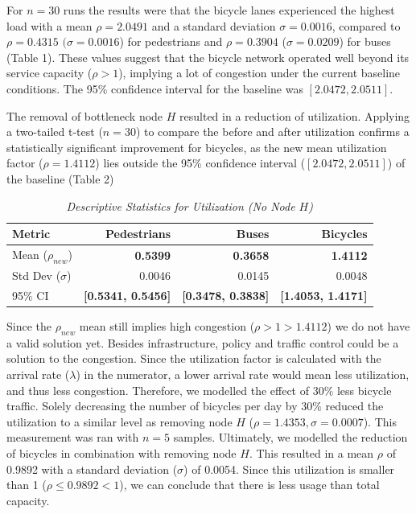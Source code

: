 \documentclass[letterpaper, 10 pt, conference]{ieeeconf}
\begin{document}
For $n=30$ runs the results were that the bicycle lanes experienced the highest load with a mean $\rho=2.0491$ and a standard deviation $\sigma=0.0016$, compared to $\rho=0.4315$ $(\sigma=0.0016$) for pedestrians and $\rho=0.3904$ ($\sigma = 0.0209$) for buses (Table 1). These values suggest that the bicycle network operated well beyond its service capacity ($\rho>1$), implying a lot of congestion under the current baseline conditions. The 95\% confidence interval for the baseline was $[2.0472, 2.0511]$. 


The removal of bottleneck node $H$ resulted in a reduction of utilization. Applying a two-tailed t-test ($n=30$) to compare the before and after utilization confirms a statistically significant improvement for bicycles, as the new mean utilization factor ($\rho=1.4112$) lies outside the 95\% confidence interval ($[2.0472, 2.0511]$) of the baseline (Table 2)

\begin{table}[h]
	\caption{\textit{Descriptive Statistics for Utilization (No Node $H$)}}
	\label{tab:agent_performance}
		\begin{tabular}{lrrr}
			\toprule
			Metric & Pedestrians & Buses & Bicycles \\
			\midrule
			Mean ($\rho_{new}$) & \textbf{0.5399} & \textbf{0.3658} & \textbf{1.4112} \\
			Std Dev ($\sigma$) & 0.0046 & 0.0145 & 0.0048 \\
			95\% CI & \textbf{[0.5341, 0.5456]} & \textbf{[0.3478, 0.3838]} & \textbf{[1.4053, 1.4171]} \\
			\bottomrule
		\end{tabular}
\end{table}

Since the $\rho_{new}$ mean still implies high congestion ($\rho>1>1.4112$) we do not have a valid solution yet.
Besides infrastructure, policy and traffic control could be a solution to the congestion. Since the utilization factor is calculated with the arrival rate ($\lambda$) in the numerator, a lower arrival rate would mean less utilization, and thus less congestion. Therefore, we modelled the effect of 30\% less bicycle traffic. Solely decreasing the number of bicycles per day by 30\% reduced the utilization to a similar level as removing node $H$ ($\rho=1.4353, \sigma=0.0007$). This measurement was ran with $n=5$ samples. Ultimately, we modelled the reduction of bicycles in combination with removing node $H$. This resulted in a mean $\rho$ of 0.9892 with a standard deviation ($\sigma$) of 0.0054. Since this utilization is smaller than 1 ($\rho\leq0.9892<1$), we can conclude that there is less usage than total capacity.
\end{document}
